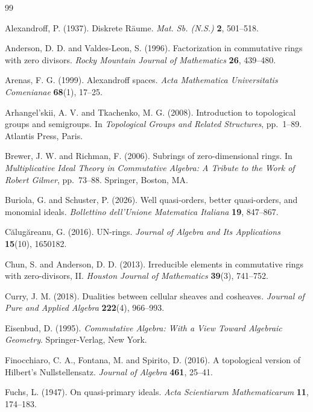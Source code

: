 \documentclass[11pt]{amsart}
\theoremstyle{plain}
\theoremstyle{definition}
\theoremstyle{remark}
\numberwithin{equation}{section}
\begin{document}
\begin{thebibliography}{99}
	
	Alexandroff, P. (1937).
	Diskrete R\"aume.
	\textit{Mat. Sb. (N.S.)} \textbf{2}, 501--518.
	
	Anderson, D. D. and Valdes-Leon, S. (1996).
	Factorization in commutative rings with zero divisors.
	\textit{Rocky Mountain Journal of Mathematics} \textbf{26}, 439--480.
	
	Arenas, F. G. (1999).
	Alexandroff spaces.
	\textit{Acta Mathematica Universitatis Comenianae} \textbf{68}(1), 17--25.
	
	Arhangel'skii, A. V. and Tkachenko, M. G. (2008).
	Introduction to topological groups and semigroups.
	In \textit{Topological Groups and Related Structures}, pp.~1--89.
	Atlantis Press, Paris.
	
	Brewer, J. W. and Richman, F. (2006).
	Subrings of zero-dimensional rings.
	In \textit{Multiplicative Ideal Theory in Commutative Algebra:
		A Tribute to the Work of Robert Gilmer}, pp.~73--88.
	Springer, Boston, MA.
	
	Buriola, G. and Schuster, P. (2026).
	Well quasi-orders, better quasi-orders, and monomial ideals.
	\textit{Bollettino dell'Unione Matematica Italiana}
	\textbf{19}, 847--867.
	
	C\u{a}lug\u{a}reanu, G. (2016).
	UN-rings.
	\textit{Journal of Algebra and Its Applications}
	\textbf{15}(10), 1650182.
	
	Chun, S. and Anderson, D. D. (2013).
	Irreducible elements in commutative rings with zero-divisors, II.
	\textit{Houston Journal of Mathematics}
	\textbf{39}(3), 741--752.
	
	Curry, J. M. (2018).
	Dualities between cellular sheaves and cosheaves.
	\textit{Journal of Pure and Applied Algebra}
	\textbf{222}(4), 966--993.
	
	Eisenbud, D. (1995).
	\textit{Commutative Algebra: With a View Toward Algebraic Geometry}.
	Springer-Verlag, New York.
	
	Finocchiaro, C. A., Fontana, M. and Spirito, D. (2016).
	A topological version of Hilbert's Nullstellensatz.
	\textit{Journal of Algebra} \textbf{461}, 25--41.
	
	Fuchs, L. (1947).
	On quasi-primary ideals.
	\textit{Acta Scientiarum Mathematicarum}
	\textbf{11}, 174--183.
	

\end{thebibliography}
\end{document}
